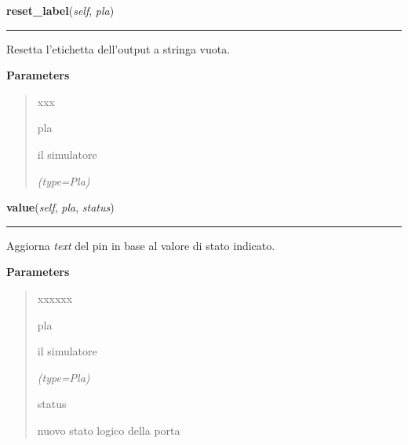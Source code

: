 \hspace{.8\funcindent}\begin{boxedminipage}{\funcwidth}

    \raggedright \textbf{reset\_label}(\textit{self}, \textit{pla})

    \vspace{-1.5ex}

    \rule{\textwidth}{0.5\fboxrule}
\setlength{\parskip}{2ex}
    Resetta l'etichetta dell'output a stringa vuota.

\setlength{\parskip}{1ex}
      \textbf{Parameters}
      \vspace{-1ex}

      \begin{quote}
        \begin{Ventry}{xxx}

          \item[pla]

          il simulatore

            {\it (type=Pla)}

        \end{Ventry}

      \end{quote}

    \end{boxedminipage}

    \label{component:OutPin:value}

    \vspace{0.5ex}

\hspace{.8\funcindent}\begin{boxedminipage}{\funcwidth}

    \raggedright \textbf{value}(\textit{self}, \textit{pla}, \textit{status})

    \vspace{-1.5ex}

    \rule{\textwidth}{0.5\fboxrule}
\setlength{\parskip}{2ex}
    Aggiorna \textit{text} del pin in base al valore di stato indicato.

\setlength{\parskip}{1ex}
      \textbf{Parameters}
      \vspace{-1ex}

      \begin{quote}
        \begin{Ventry}{xxxxxx}

          \item[pla]

          il simulatore

            {\it (type=Pla)}

          \item[status]

          nuovo stato logico della porta

        \end{Ventry}

      \end{quote}

    \end{boxedminipage}

